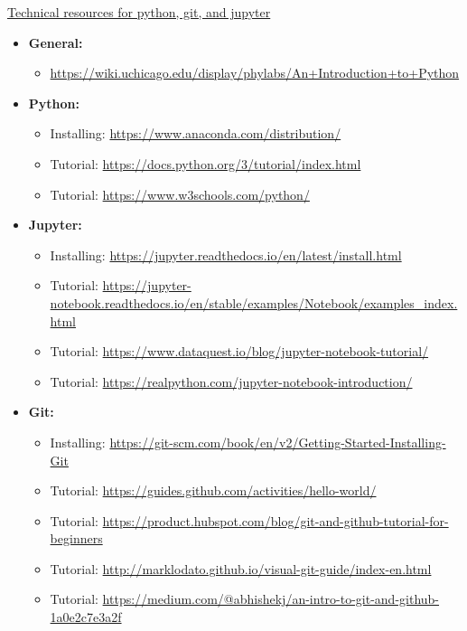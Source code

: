 \noindent \underline{Technical resources for python, git, and jupyter}

\begin{itemize}

  \item \textbf{General:}
  \begin{itemize}
    \item \url{https://wiki.uchicago.edu/display/phylabs/An+Introduction+to+Python}
  \end{itemize}
  \item \textbf{Python:}
  \begin{itemize}
    \item Installing: \url{https://www.anaconda.com/distribution/}
    \item Tutorial: \url{https://docs.python.org/3/tutorial/index.html}
    \item Tutorial: \url{https://www.w3schools.com/python/}
  \end{itemize}
  \item \textbf{Jupyter:}
  \begin{itemize}
    \item Installing: \url{https://jupyter.readthedocs.io/en/latest/install.html}
    \item Tutorial: \url{https://jupyter-notebook.readthedocs.io/en/stable/examples/Notebook/examples_index.html}
    \item Tutorial: \url{https://www.dataquest.io/blog/jupyter-notebook-tutorial/}
    \item Tutorial: \url{https://realpython.com/jupyter-notebook-introduction/}
  \end{itemize}
  \item \textbf{Git:}
    \begin{itemize}
    \item Installing: \url{https://git-scm.com/book/en/v2/Getting-Started-Installing-Git}
    \item Tutorial: \url{https://guides.github.com/activities/hello-world/}
    \item Tutorial: \url{https://product.hubspot.com/blog/git-and-github-tutorial-for-beginners}
    \item Tutorial: \url{http://marklodato.github.io/visual-git-guide/index-en.html}
    \item Tutorial: \url{https://medium.com/@abhishekj/an-intro-to-git-and-github-1a0e2c7e3a2f}
  \end{itemize}

  
\end{itemize}  

